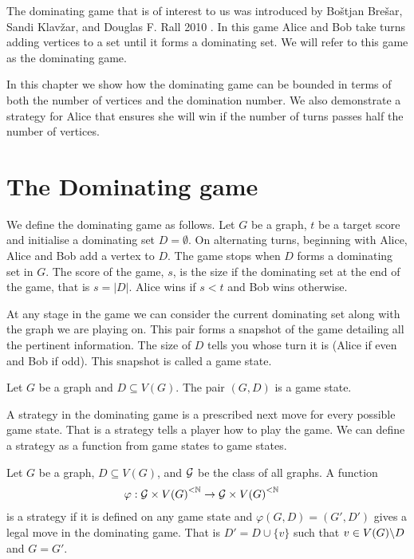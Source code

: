 The dominating game that is of interest to us was introduced by Bo\v{s}tjan Bre\v{s}ar, Sandi Klav\v{z}ar, and Douglas F. Rall 2010 \cite{BrKlRa2010}. In this game Alice and Bob take turns adding vertices to a set until it forms a dominating set. We will refer to this game as the dominating game.

In this chapter we show how the dominating game can be bounded in terms of both the number of vertices and the domination number. We also demonstrate a strategy for Alice that ensures she will win if the number of turns passes half the number of vertices.


\section{The Dominating game}

We define the dominating game as follows. Let $G$ be a graph, $t$ be a target score and initialise a dominating set $D=\emptyset$. On alternating turns, beginning with Alice, Alice and Bob add a vertex to $D$. The game stops when $D$ forms a dominating set in $G$. The score of the game, $s$, is the size if the dominating set at the end of the game, that is $s=|D|$. Alice wins if $s<t$ and Bob wins otherwise. %

At any stage in the game we can consider the current dominating set along with the graph we are playing on. This pair forms a snapshot of the game detailing all the pertinent information. The size of $D$ tells you whose turn it is (Alice if even and Bob if odd). This snapshot is called a game state. 

\begin{definition}
    Let $G$ be a graph and $D\subseteq V(G)$. The pair $(G,D)$ is a game state.
\end{definition}

A strategy in the dominating game is a prescribed next move for every possible game state. That is a strategy tells a player how to play the game. We can define a strategy as a function from game states to game states. 

\begin{definition}
    Let $G$ be a graph, $D\subseteq V(G)$, and $\mathcal{G}$ be the class of all graphs. A function
    \begin{align*}        
        \varphi &: \mathcal{G} \times {V(G)}^{<\mathbb{N}} \to \mathcal{G}\times{V(G)}^{<\mathbb{N}} 
    \end{align*}
    is a strategy if it is defined on any game state and $\varphi(G,D)=(G',D')$ gives a legal move in the dominating game. That is $D'=D\cup \{v\}$ such that $v\in V(G)\backslash D$ and $G=G'$. 
\end{definition}

